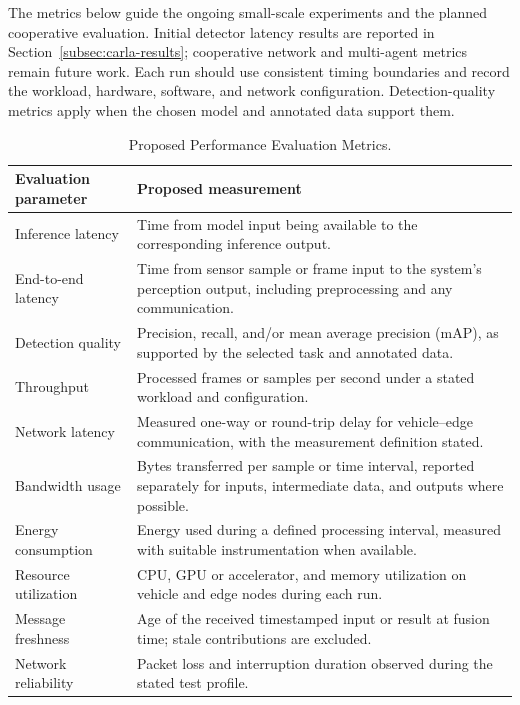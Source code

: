 \documentclass[12pt,a4paper,oneside]{report}
\begin{document}
The metrics below guide the ongoing small-scale experiments and the planned
cooperative evaluation. Initial detector latency results are reported in
Section~\ref{subsec:carla-results}; cooperative network and multi-agent
metrics remain future work. Each run should use consistent timing
boundaries and record the workload, hardware, software, and network
configuration. Detection-quality metrics apply when the chosen model and
annotated data support them.

\begin{table}[H]
  \centering
  \footnotesize
  \renewcommand{\arraystretch}{1.15}
  \caption{Proposed Performance Evaluation Metrics.}
  \label{tab:proposed-evaluation-metrics}
  \begin{tabularx}{\textwidth}{
    >{\raggedright\arraybackslash}p{}
    >{\raggedright\arraybackslash}X}
    \toprule
    Evaluation parameter & Proposed measurement \\
    \midrule
    Inference latency & Time from model input being available to the corresponding inference output. \\
    End-to-end latency & Time from sensor sample or frame input to the system's perception output, including preprocessing and any communication. \\
    Detection quality & Precision, recall, and/or mean average precision (mAP), as supported by the selected task and annotated data. \\
    Throughput & Processed frames or samples per second under a stated workload and configuration. \\
    Network latency & Measured one-way or round-trip delay for vehicle--edge communication, with the measurement definition stated. \\
    Bandwidth usage & Bytes transferred per sample or time interval, reported separately for inputs, intermediate data, and outputs where possible. \\
    Energy consumption & Energy used during a defined processing interval, measured with suitable instrumentation when available. \\
    Resource utilization & CPU, GPU or accelerator, and memory utilization on vehicle and edge nodes during each run. \\
    Message freshness & Age of the received timestamped input or result at fusion time; stale contributions are excluded. \\
    Network reliability & Packet loss and interruption duration observed during the stated test profile. \\
    \bottomrule
  \end{tabularx}
\end{table}
\end{document}
